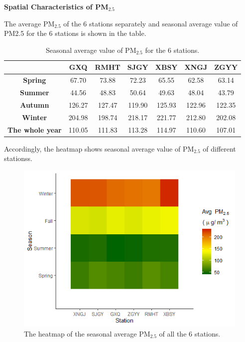 \documentclass[12pt]{article}
\newcommand{\scsection}[1]
    {\begin{center}
        {\bf\large #1}
    \end{center}
    \vspace{-0.15 cm}
}
\numberwithin{equation}{section}
\begin{document}
\scsection{Spatial Characteristics of PM$_{2.5}$}

The average PM$_{2.5}$ of the 6 stations separately and seasonal average value of PM2.5 for the 6 stations is shown in the table.

\begin{table}[htbp]
	\caption{Seasonal average value of PM$_{2.5}$ for the 6 stations.}
	\label{Tab:station_average}
	\begin{center}
		\begin{tabular}{ccccccc}
			\toprule
			&\textbf{GXQ} & \textbf{RMHT} & \textbf{SJGY} & \textbf{XBSY} & \textbf{XNGJ} & \textbf{ZGYY}\\
			\midrule
			\textbf{Spring} & 67.70 & 73.88 & 72.23 & 65.55 & 62.58 & 63.14\\
			\textbf{Summer} & 44.56 & 48.83 & 50.64 & 49.63 & 48.04 & 43.79\\
			\textbf{Autumn} & 126.27 & 127.47 & 119.90 & 125.93 & 122.96 & 122.35\\
			\textbf{Winter} & 204.98 & 198.74 & 218.17 & 221.77 & 212.80 & 202.08\\
			\midrule
			\textbf{The whole year} & 110.05 & 111.83 & 113.28 & 114.97 & 110.60 & 107.01\\			
			\bottomrule
		\end{tabular}
	\end{center}
\end{table}

Accordingly, the heatmap shows seasonal average value of PM$_{2.5}$ of different stationss. 

\begin{figure}[htbp]
	\centering
	\includegraphics[]{newheatmap.png}
	\caption{\footnotesize The heatmap of the seasonal average PM$_{2.5}$ of all the 6 stations.}
	\label{fig:heatmap}
\end{figure}
\end{document}
